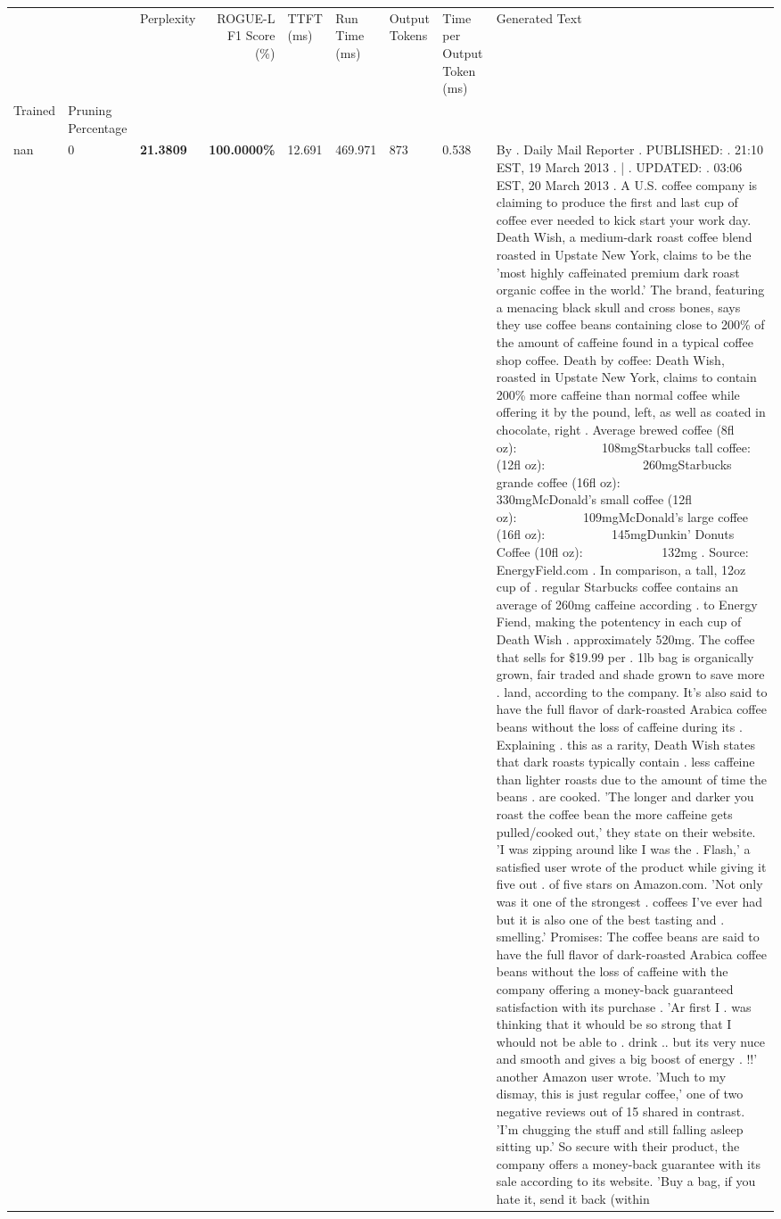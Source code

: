 \begin{table}[H]
{\label{tab:evaluation-pipeline-6}
\begin{tabular}{lllrlllll}
\toprule
 &  & Perplexity & ROGUE-L F1 Score (\%) & TTFT (ms) & Run Time (ms) & Output Tokens & Time per Output Token (ms) & Generated Text \\
Trained & Pruning Percentage &  &  &  &  &  &  &  \\
\midrule
nan & 0 & \bfseries 21.3809 & \bfseries 100.0000\% & 12.691 & 469.971 & 873 & 0.538 & By . Daily Mail Reporter . PUBLISHED: . 21:10 EST, 19 March 2013 . | . UPDATED: . 03:06 EST, 20 March 2013 . A U.S. coffee company is claiming to produce the first and last cup of coffee ever needed to kick start your work day. Death Wish, a medium-dark roast coffee blend roasted in Upstate New York, claims to be the 'most highly caffeinated premium dark roast organic coffee in the world.' The brand, featuring a menacing black skull and cross bones, says they use coffee beans containing close to 200\% of the amount of caffeine found in a typical coffee shop coffee. Death by coffee: Death Wish, roasted in Upstate New York, claims to contain 200\% more caffeine than normal coffee while offering it by the pound, left, as well as coated in chocolate, right . Average brewed coffee (8fl oz):              108mgStarbucks tall coffee: (12fl oz):                260mgStarbucks grande coffee (16fl oz):         330mgMcDonald's small coffee (12fl oz):           109mgMcDonald's large coffee (16fl oz):           145mgDunkin' Donuts Coffee (10fl oz):             132mg . Source: EnergyField.com . In comparison, a tall, 12oz cup of . regular Starbucks coffee contains an average of 260mg caffeine according . to Energy Fiend, making the potentency in each cup of Death Wish . approximately 520mg. The coffee that sells for \$19.99 per . 1lb bag is organically grown, fair traded and shade grown to save more . land, according to the company. It's also said to have the full flavor of dark-roasted Arabica coffee beans without the loss of caffeine during its . Explaining . this as a rarity, Death Wish states that dark roasts typically contain . less caffeine than lighter roasts due to the amount of time the beans . are cooked. 'The longer and darker you roast the coffee bean the more caffeine gets pulled/cooked out,' they state on their website. 'I was zipping around like I was the . Flash,' a satisfied user wrote of the product while giving it five out . of five stars on Amazon.com. 'Not only was it one of the strongest . coffees I've ever had but it is also one of the best tasting and . smelling.’ Promises: The coffee beans are said to have the full flavor of dark-roasted Arabica coffee beans without the loss of caffeine with the company offering a money-back guaranteed satisfaction with its purchase . 'Ar first I . was thinking that it whould be so strong that I whould not be able to . drink .. but its very nuce and smooth and gives a big boost of energy . !!' another Amazon user wrote. 'Much to my dismay, this is just regular coffee,' one of two negative reviews out of 15 shared in contrast. 'I'm chugging the stuff and still falling asleep sitting up.' So secure with their product, the company offers a money-back guarantee with its sale according to its website. 'Buy a bag, if you hate it, send it back (within 
\end{tabular}}
\end{table}

